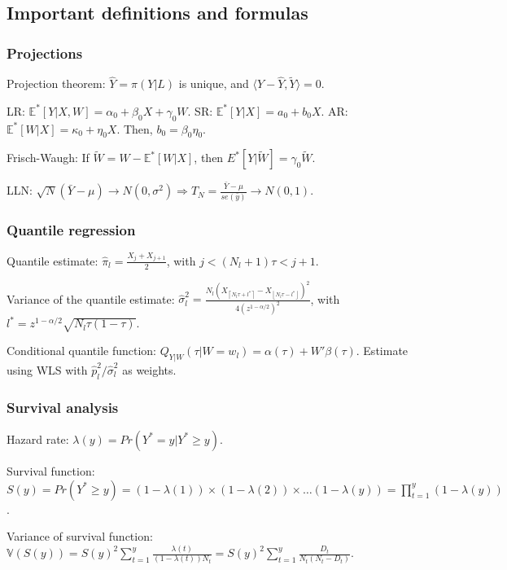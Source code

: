 \documentclass{article}
\begin{document}
\subsection*{Important definitions and formulas}

\subsubsection*{Projections}

Projection theorem: $\hat{Y} = \pi(Y|L)$ is unique, and $\langle Y - \hat{Y}, \tilde{Y} \rangle = 0$.

LR: $\mathbb{E}^*[Y|X,W] = \alpha_0 + \beta_0 X + \gamma_0 W$. SR: $\mathbb{E}^*[Y|X] = a_0 + b_0X$. AR: $\mathbb{E}^*[W|X] = \kappa_0 + \eta_0X$. Then, $b_0 = \beta_0 \eta_0$.

Frisch-Waugh: If $\tilde{W} = W - \mathbb{E}^*[W|X]$, then $E^*[Y|\tilde{W}] = \gamma_0 \tilde{W}$.

LLN: $\sqrt{N}(\bar{Y} - \mu) \rightarrow N(0, \sigma^2) \Rightarrow T_N = \frac{\bar{Y} - \mu}{se(\bar{y})} \rightarrow N(0,1)$.

\subsubsection*{Quantile regression}

Quantile estimate: $\hat{\pi}_l = \frac{X_j + X_{j+1}}{2}$, with $j < (N_l+1)\tau < j+1$.

Variance of the quantile estimate: $\hat{\sigma}_l^2 = \frac{N_l(X_{\left\lceil N_l \tau + l^* \right\rceil} - X_{\left\lfloor N_l \tau - l^* \right\rfloor})^2 }{ 4(z^{1 - \alpha/2})^2}$, with $l^* = z^{1-\alpha/2} \sqrt{N_l \tau (1-\tau)}$.

Conditional quantile function: $Q_{Y|W}(\tau|W=w_l) = \alpha(\tau) + W' \beta(\tau)$. Estimate using WLS with $\hat{p}_l^2/\hat{\sigma}_l^2$ as weights.

\subsubsection*{Survival analysis}

Hazard rate: $\lambda(y) = Pr(Y^* = y | Y^* \geq y)$.

Survival function: $S(y) = Pr(Y^* \geq y) = (1 - \lambda(1)) \times (1 - \lambda(2)) \times \ldots (1 - \lambda(y)) = \prod \limits_{t=1}^y (1-\lambda(y))$.

Variance of survival function: $\mathbb{V}(S(y)) = S(y)^2 \sum \limits_{t=1}^y \frac{\lambda(t)}{(1 - \lambda(t)) N_t} = S(y)^2 \sum \limits_{t=1}^y \frac{D_t}{N_t(N_t - D_t)}$.
\end{document}
